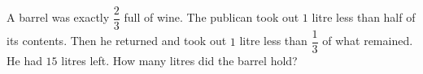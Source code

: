 A barrel was exactly $\dfrac{2}{3}$ full of wine. The publican took out $1$ litre less than half of its contents. Then he returned and took out $1$ litre less than $\dfrac{1}{3}$ of what remained. He had $15$ litres left. How many litres did the barrel hold?
